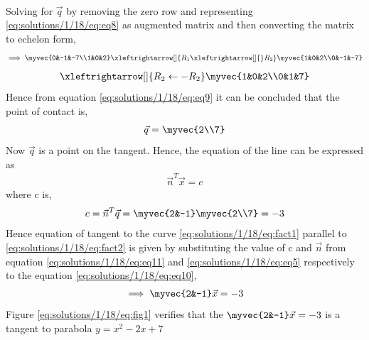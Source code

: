 \begin{enumerate}
\begin{align}
			\label{eq:solutions/1/18/eq:eq8}
		\end{align}
		Solving for $\vec{q}$ by removing the zero row and representing \eqref{eq:solutions/1/18/eq:eq8} as augmented matrix and then converting the matrix to echelon form,
		\begin{align}
			\implies \myvec{0&-1&-7\\1&0&2} \xleftrightarrow[]{R_1\xleftrightarrow[]{}R_2} \myvec{1&0&2\\0&-1&-7}
		\end{align}
		\begin{align}
			\xleftrightarrow[]{R_2\leftarrow  -R_2} \myvec{1&0&2\\0&1&7}
			\label{eq:solutions/1/18/eq:eq9}
		\end{align}
		Hence from equation \eqref{eq:solutions/1/18/eq:eq9} it can be concluded that the point of contact is,
		\begin{align}
			\vec{q} = \myvec{2\\7}
		\end{align}
		Now $\vec{q}$ is a point on the tangent. Hence, the equation of the
		line can be expressed as
		\begin{align}
			\vec{n}^T\vec{x} = c
			\label{eq:solutions/1/18/eq:eq10}
		\end{align}
		where c is,
		\begin{align}
			c = \vec{n}^T\vec{q} = \myvec{2&-1}\myvec{2\\7} = -3 
			\label{eq:solutions/1/18/eq:eq11}
		\end{align}
		Hence equation of tangent to the curve \eqref{eq:solutions/1/18/eq:fact1} parallel to \eqref{eq:solutions/1/18/eq:fact2} is given by substituting the value of c and $\vec{n}$ from equation \eqref{eq:solutions/1/18/eq:eq11} and \eqref{eq:solutions/1/18/eq:eq5} respectively to the equation \eqref{eq:solutions/1/18/eq:eq10},
		\begin{align}
			\implies\myvec{2&-1}\vec{x} = -3 
		\end{align}
		Figure \ref{eq:solutions/1/18/eq:fig1} verifies that the $\myvec{2&-1}\vec{x} = -3$ is a tangent to parabola  $y = x^2-2x+7$ \\\\
	

\end{enumerate}
